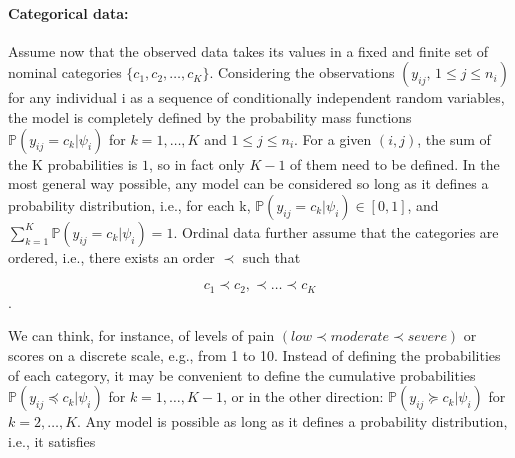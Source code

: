 % 

\paragraph{Categorical data:} Assume now that the observed data takes its values in a fixed and finite set of nominal categories $\{c_1, c_2,\ldots , c_K\}$. Considering the observations $(y_{ij},\, 1 \leq j \leq n_i)$ for any individual i as a sequence of conditionally independent random variables, the model is completely defined by the probability mass functions $\mathbb{P}(y_{ij}=c_k | \psi_i)$ for $k=1,\ldots, K$ and $1 \leq j \leq n_i$. For a given $(i,j)$, the sum of the K probabilities is $1$, so in fact only $K-1$ of them need to be defined. In the most general way possible, any model can be considered so long as it defines a probability distribution, i.e., for each k, $\mathbb{P}(y_{ij}=c_k | \psi_i) \in [0,1]$, and $\sum_{k=1}^{K} \mathbb{P}(y_{ij}=c_k | \psi_i) =1$. Ordinal data further assume that the categories are ordered, i.e., there exists an order $\prec$ such that

$$c_1 \prec c_2,\prec \ldots \prec c_K $$.

We can think, for instance, of levels of pain $(low \prec moderate \prec severe)$ or scores on a discrete scale, e.g., from 1 to 10. Instead of defining the probabilities of each category, it may be convenient to define the cumulative probabilities $\mathbb{P}(y_{ij} \preceq c_k | \psi_i)$ for $k=1,\ldots ,K-1$, or in the other direction: $\mathbb{P}(y_{ij} \succeq c_k | \psi_i)$ for $k=2,\ldots, K$. Any model is possible as long as it defines a probability distribution, i.e., it satisfies

